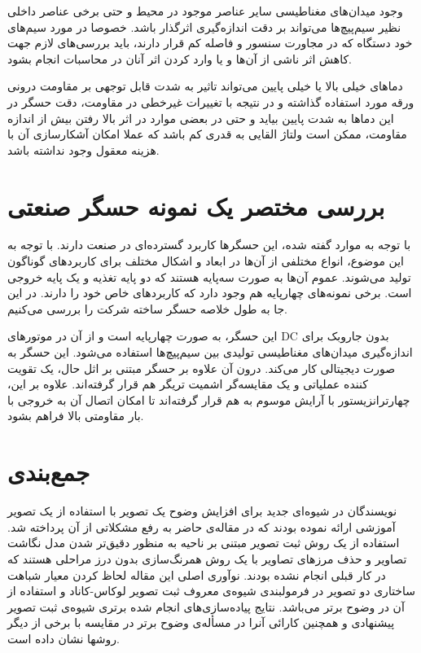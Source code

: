 \documentclass[conference]{IEEEtran-ModifiedForMVIP}
\begin{document}
 وجود میدان‌های مغناطیسی سایر عناصر موجود در محیط و حتی برخی عناصر داخلی نظیر سیم‌پیچ‌ها می‌تواند بر دقت اندازه‌گیری اثرگذار باشد. خصوصا در مورد سیم‌های خود دستگاه که در مجاورت سنسور و فاصله کم قرار دارند، باید بررسی‌های لازم جهت کاهش اثر ناشی از آن‌ها و یا وارد کردن اثر آنان در محاسبات انجام بشود. \cite{ratna}
 
 دماهای خیلی بالا یا خیلی پایین می‌تواند تاثیر به شدت قابل توجهی بر مقاومت درونی ورقه مورد استفاده گذاشته \cite{ratna} و در نتیجه با تغییرات غیرخطی در مقاومت، دقت حسگر در این دماها به شدت پایین بیاید و حتی در بعضی موارد در اثر بالا رفتن بیش از اندازه مقاومت،‌ ممکن است ولتاژ القایی به قدری کم باشد که عملا امکان آشکارسازی آن با هزینه معقول وجود نداشته باشد.
 
\section{بررسی مختصر یک نمونه‌ حسگر  صنعتی}

با توجه به موارد گفته شده، این حسگرها کاربرد گسترده‌ای در صنعت دارند. با توجه به این موضوع، انواع مختلفی از آن‌ها در ابعاد و اشکال مختلف برای کاربردهای گوناگون تولید می‌شوند. عموم آن‌ها به صورت سه‌پایه هستند که دو پایه تغذیه و یک پایه خروجی است. برخی نمونه‌های چهارپایه هم وجود دارد که کاربردهای خاص خود را دارند. در این جا به طول خلاصه حسگر   ساخته شرکت  را بررسی می‌کنیم.

این حسگر، به صورت چهارپایه است و از آن در موتورهای DC بدون جاروبک برای اندازه‌گیری میدان‌های مغناطیسی تولیدی بین سیم‌پیچ‌ها استفاده می‌شود. این حسگر به صورت دیجیتالی کار می‌کند. درون آن علاوه بر حسگر مبتنی بر اثل حال، یک تقویت کننده عملیاتی و یک مقایسه‌گر اشمیت تریگر هم قرار گرفته‌اند. علاوه بر این، چهارترانزیستور  با آرایش موسوم به  هم قرار گرفته‌اند تا امکان اتصال آن به خروجی با بار مقاومتی بالا فراهم بشود.



\section{جمع‌بندی}\label{Sec:Conclusion}
نویسندگان در شیوه‌ای جدید برای افزایش وضوح یک تصویر با استفاده از یک تصویر آموزشی ارائه نموده بودند که در مقاله‌ی حاضر به رفع مشکلاتی از آن پرداخته شد. استفاده از یک روش ثبت تصویر مبتنی بر ناحیه به منظور دقیق‌تر شدن مدل نگاشت تصاویر و حذف مرزهای تصاویر با یک روش همرنگ‌سازی بدون درز مراحلی هستند که در کار قبلی انجام نشده بودند. نوآوری اصلی این مقاله لحاظ کردن معیار شباهت ساختاری دو تصویر در فرمولبندی شیوه‌ی معروف ثبت تصویر لوکاس-کاناد و استفاده از آن در وضوح برتر می‌باشد. نتایج پیاده‌سازی‌های انجام شده برتری شیوه‌ی ثبت تصویر پیشنهادی و همچنین کارائی آنرا در مسأله‌ی وضوح برتر در مقایسه با برخی از دیگر روشها نشان داده است.
\end{document}
